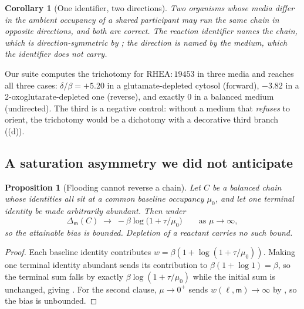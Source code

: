 \documentclass[11pt,twocolumn,a4paper]{article}
\theoremstyle{thmstyle}
\newtheorem{proposition}[theorem]{Proposition}
\newtheorem{corollary}[theorem]{Corollary}
\theoremstyle{definition}
\theoremstyle{remark}
\newcommand{\med}{\mathsf{m}}
\newcommand{\flo}{\beta}
\begin{document}
\begin{corollary}[One identifier, two directions]
\label{cor:oneidentifier}
Two organisms whose media differ in the ambient occupancy of a shared
participant may run the same chain in opposite directions, and both are
correct. The reaction identifier names the chain, which is
direction-symmetric by ; the direction is named by the
medium, which the identifier does not carry.
\end{corollary}

Our suite computes the trichotomy for $\mathrm{RHEA}{:}19453$ in three media
and reaches all three cases: $\delta/\flo = +5.20$ in a
glutamate-depleted cytosol (forward), $-3.82$ in a 2-oxoglutarate-depleted one
(reverse), and exactly $0$ in a balanced medium (undirected). The third is a
negative control: without a medium that \emph{refuses} to orient, the
trichotomy would be a dichotomy with a decorative third branch
((d)).

\subsection{A saturation asymmetry we did not anticipate}

\begin{proposition}[Flooding cannot reverse a chain]
\label{prop:saturation}
Let $C$ be a balanced chain whose identities all sit at a common baseline
occupancy $\mu_0$, and let one terminal identity be made arbitrarily abundant.
Then under 
\begin{equation}
\Delta_\med(C) \;\longrightarrow\; -\flo\log\!\bigl(1+\tau/\mu_0\bigr)
\qquad \text{as } \mu \to \infty,
\label{eq:saturation}
\end{equation}
so the attainable bias is bounded. Depletion of a reactant carries no such
bound.
\end{proposition}

\begin{proof}
Each baseline identity contributes $w=\flo(1+\log(1+\tau/\mu_0))$. Making one
terminal identity abundant sends its contribution to $\flo(1+\log 1)=\flo$, so
the terminal sum falls by exactly $\flo\log(1+\tau/\mu_0)$ while the initial
sum is unchanged, giving . For the second clause,
$\mu \to 0^+$ sends $w(\ell,\med) \to \infty$ by , so
the bias is unbounded.
\end{proof}
\end{document}
